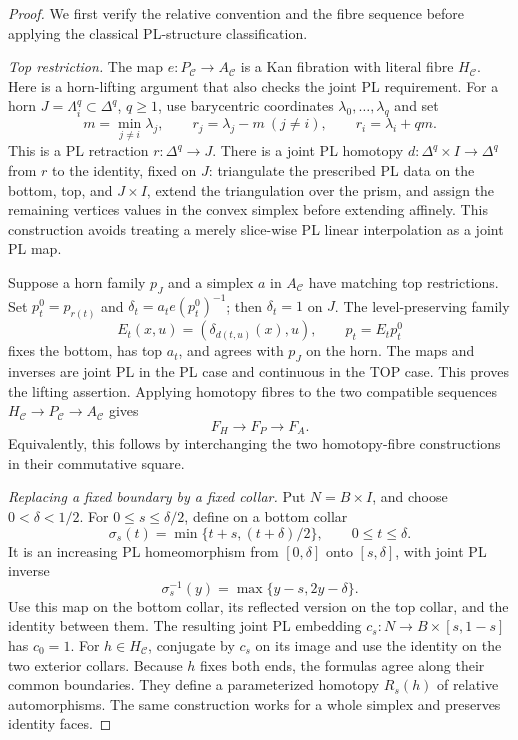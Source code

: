 \begin{proof}
We first verify the relative convention and the fibre sequence before
applying the classical PL-structure classification.

\emph{Top restriction.}
The map $e:P_{\mathcal C}\to A_{\mathcal C}$ is a Kan fibration
with literal fibre $H_{\mathcal C}$.  Here is a horn-lifting argument
that also checks the joint PL requirement.  For a horn
$J=\Lambda_i^q\subset\Delta^q$, $q\geq1$, use barycentric coordinates
$\lambda_0,\ldots,\lambda_q$ and set
\[
 m=\min_{j\ne i}\lambda_j,\qquad
 r_j=\lambda_j-m\ (j\ne i),\qquad r_i=\lambda_i+qm.
\]
This is a PL retraction $r:\Delta^q\to J$.  There is a joint PL
homotopy $d:\Delta^q\times I\to\Delta^q$ from $r$ to the identity,
fixed on $J$: triangulate the prescribed PL data on the bottom, top,
and $J\times I$, extend the triangulation over the prism, and assign
the remaining vertices values in the convex simplex before extending
affinely.  This construction avoids treating a merely slice-wise PL
linear interpolation as a joint PL map.

Suppose a horn family $p_J$ and a simplex $a$ in $A_{\mathcal C}$
have matching top restrictions.  Set
$p^0_t=p_{r(t)}$ and $\delta_t=a_t e(p^0_t)^{-1}$; then
$\delta_t=1$ on $J$.  The level-preserving family
\[
 E_t(x,u)=(\delta_{d(t,u)}(x),u),\qquad p_t=E_t p^0_t
\]
fixes the bottom, has top $a_t$, and agrees with $p_J$ on the horn.
The maps and inverses are joint PL in the PL case and continuous in
the TOP case.  This proves the lifting assertion.  Applying homotopy
fibres to the two compatible sequences
$H_{\mathcal C}\to P_{\mathcal C}\to A_{\mathcal C}$ gives
\begin{equation}\label{eq:relative-comparison-fibre-sequence}
 F_H\longrightarrow F_P\longrightarrow F_A.
\end{equation}
Equivalently, this follows by interchanging the two homotopy-fibre
constructions in their commutative square.

\emph{Replacing a fixed boundary by a fixed collar.}
Put $N=B\times I$, and choose $0<\delta<1/2$.  For
$0\leq s\leq\delta/2$, define on a bottom collar
\[
 \sigma_s(t)=\min\{t+s,(t+\delta)/2\},\qquad 0\leq t\leq\delta.
\]
It is an increasing PL homeomorphism from $[0,\delta]$ onto
$[s,\delta]$, with joint PL inverse
\[
 \sigma_s^{-1}(y)=\max\{y-s,2y-\delta\}.
\]
Use this map on the bottom collar, its reflected version on the top
collar, and the identity between them.  The resulting joint PL
embedding $c_s:N\to B\times[s,1-s]$ has $c_0=1$.
For $h\in H_{\mathcal C}$, conjugate by $c_s$ on its image and use
the identity on the two exterior collars.  Because $h$ fixes both
ends, the formulas agree along their common boundaries.  They define
a parameterized homotopy $R_s(h)$ of relative automorphisms.  The
same construction works for a whole simplex and preserves identity
faces.


\end{proof}
